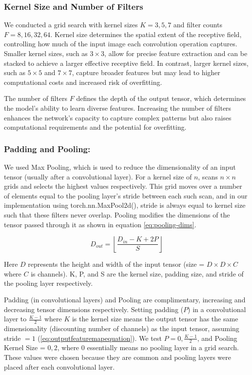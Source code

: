 \subsubsection{Kernel Size and Number of Filters}

We conducted a grid search with kernel sizes $K = {3, 5, 7}$ and filter counts $F = {8, 16, 32, 64}$. Kernel size determines the spatial extent of the receptive field, controlling how much of the input image each convolution operation captures. Smaller kernel sizes, such as $3\times3$, allow for precise feature extraction and can be stacked to achieve a larger effective receptive field. In contrast, larger kernel sizes, such as $5\times5$ and $7\times7$, capture broader features but may lead to higher computational costs and increased risk of overfitting.

The number of filters $F$ defines the depth of the output tensor, which determines the model's ability to learn diverse features. Increasing the number of filters enhances the network's capacity to capture complex patterns but also raises computational requirements and the potential for overfitting.
\subsubsection{Padding and Pooling:}

We used Max Pooling, which is used to reduce the dimensionality of an input tensor (usually after a convolutional layer). For a kernel size of $n$, scans $n\times n$ grids and selects the highest values respectively. This grid moves over a number of elements equal to the pooling layer's stride between each such scan, and in our implementation using torch.nn.MaxPool2d(), stride is always equal to kernel size such that these filters never overlap. Pooling modifies the dimensions of the tensor passed through it as shown in equation \ref{eq:pooling-dims}.

\begin{equation}
    D_{out} = \left\lfloor\frac {D_{in} -K + 2P}{S}\right\rfloor
    \label{eq:pooling-dims}
\end{equation}


Here $D$ represents the height and width of the input tensor (size = $D\times D \times C$ where $C$ is channels). K, P, and S are the kernel size, padding size, and stride of the pooling layer respectively.

Padding (in convolutional layers) and Pooling are complimentary, increasing and decreasing tensor dimensions respectively. Setting padding ($P$) in a convolutional layer to $\frac {K-1}2$ where $K$ is the kernel size means the output tensor has the same dimensionality (discounting number of channels) as the input tensor, assuming stride $= 1$ (\ref{eq:outputfeaturemapequation}). We test $P = 0,\frac {K-1}2$, and Pooling Kernel Size = $0,2$, where $0$ essentially means no pooling layer in a grid search. These values were chosen because they are common and pooling layers were placed after each convolutional layer.

